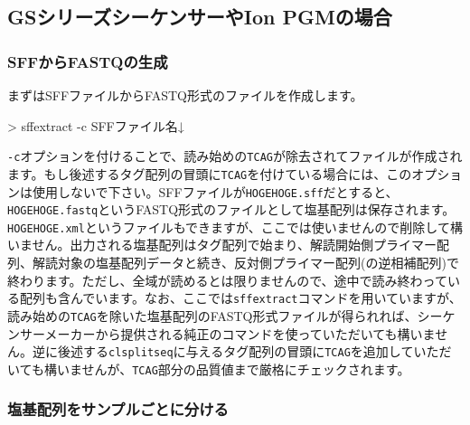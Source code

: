 \documentclass[titlepage,10pt,a4paper]{jsbook}
\newenvironment{cmd}{\begin{oframed}\raggedright\ttfamily\footnotesize\setlength{\baselineskip}{1.4em}}{\end{oframed}\vspace{-1em}}
\begin{document}
\subsection{GSシリーズシーケンサーやIon PGMの場合}

\subsubsection{SFFからFASTQの生成}

まずはSFFファイルからFASTQ形式のファイルを作成します。
\begin{cmd}
{\textgreater} sff{\textunderscore}extract -c SFFファイル名↓
\end{cmd}
\texttt{-c}オプションを付けることで、読み始めの\texttt{TCAG}が除去されてファイルが作成されます。もし後述するタグ配列の冒頭に\texttt{TCAG}を付けている場合には、このオプションは使用しないで下さい。SFFファイルが\texttt{HOGEHOGE.sff}だとすると、\texttt{HOGEHOGE.fastq}というFASTQ形式のファイルとして塩基配列は保存されます。\texttt{HOGEHOGE.xml}というファイルもできますが、ここでは使いませんので削除して構いません。出力される塩基配列はタグ配列で始まり、解読開始側プライマー配列、解読対象の塩基配列データと続き、反対側プライマー配列(の逆相補配列)で終わります。ただし、全域が読めるとは限りませんので、途中で読み終わっている配列も含んでいます。なお、ここでは\texttt{sff{\textunderscore}extract}コマンドを用いていますが、読み始めの\texttt{TCAG}を除いた塩基配列のFASTQ形式ファイルが得られれば、シーケンサーメーカーから提供される純正のコマンドを使っていただいても構いません。逆に後述する\texttt{clsplitseq}に与えるタグ配列の冒頭に\texttt{TCAG}を追加していただいても構いませんが、\texttt{TCAG}部分の品質値まで厳格にチェックされます。

\subsubsection{塩基配列をサンプルごとに分ける}
\end{document}
